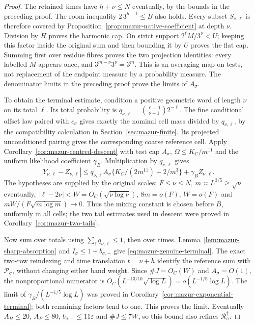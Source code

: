 \documentclass[11pt]{article}
\theoremstyle{remark}\newtheorem{remark}[proposition]{Remark}
\begin{document}
\begin{proof}
The retained times have $h+\nu\le N$ eventually, by the bounds in the
preceding proof. The room inequality $2\,3^{h-1}\le B$ also holds.
Every subset $S_{\nu,\ell}$ is therefore covered by
Proposition~\ref{prop:mazur-native-coefficient} at depth $\nu$.
Division by $H$ proves the harmonic cap. On strict support
$2^\ell M/3^\nu<U$; keeping this factor inside the original sum and then
bounding it by $U$ proves the flat cap. Summing first over residue fibres
proves the two projection identities: every labelled $M$ appears once,
and $3^{m-\nu}3^\nu=3^m$. This is an averaging map on tests, not
replacement of the endpoint measure by a probability measure.
The denominator limits in the preceding proof prove the limits of $A_\sigma$.

To obtain the terminal estimate, condition a positive geometric word of
length $\nu$ on its total $\ell$. Its total probability is
$q_{\nu,\ell}=\binom{\ell-1}{\nu-1}2^{-\ell}$. The fine conditional
offset law paired with $c_\sigma$ gives exactly the nominal cell mass
divided by $q_{\nu,\ell}$, by the compatibility calculation in
Section~\ref{sec:mazur-finite}. Its projected unconditioned pairing gives
the corresponding coarse reference cell. Apply
Corollary~\ref{cor:mazur-centred-descent} with test cap $A_\sigma$,
$\Omega\le K_C/m^{11}$ and the uniform likelihood coefficient
$\gamma_B$. Multiplication by $q_{\nu,\ell}$ gives
\[
 |Y_{\nu,\ell}-Z_{\nu,\ell}|
 \le q_{\nu,\ell} A_\sigma
       \{K_C/(2m^{11})+2/m^3\}+\gamma_B Z_{\nu,\ell}.
\]
The hypotheses are supplied by the original scales:
$F\le\nu\le N$, $m\asymp L^{3/5}\ge\sqrt{\nu}$ eventually,
$|\ell-2\nu|<W=O_C(\sqrt{\nu\log\nu})$,
$8m=o(F)$, $W=o(F)$ and $mW/(F\sqrt{m\log m})\to0$.
Thus the mixing constant is chosen before $B$, uniformly in all cells;
the two tail estimates used in descent were proved in
Corollary~\ref{cor:mazur-two-tails}.

Now sum over totals using $\sum_\ell q_{\nu,\ell}\le1$, then over times.
Lemma~\ref{lem:mazur-sharp-absorption} and
$I_\sigma\le1+b_{\sigma,-}$ give
\eqref{eq:mazur-genuine-terminal}. The exact two-row reindexing and
time translation $t=\nu+h$ identify the reference sum with
$\mathcal P_\sigma$, without changing either band weight.
Since $\#J=O_C(W)$ and $A_\sigma=O(1)$,
the nonproportional numerator is
$O_C(L^{-13/10}\sqrt{\log L})=o(L^{-1/5}\log L)$.
The limit of $\gamma_B/(L^{-1/5}\log L)$ was proved in
Corollary~\ref{cor:mazur-exponential-terminal}; both remaining factors
tend to one. This proves the limit. Eventually
$A_H\le20$, $A_F\le80$, $b_{\sigma,-}\le11\varepsilon$ and $\#J\le7W$,
so this bound also refines $\mathcal R_\sigma^\dagger$.
\end{proof}
\end{document}
